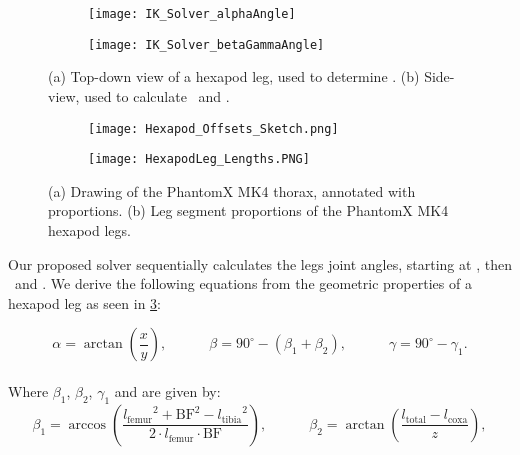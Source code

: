 \begin{figure}[!h]
	\begin{subfigure}{.5\textwidth} %
		\centering
		\texttt{[image: IK\_Solver\_alphaAngle]}  %
		\caption{}
		\label{figure: IK Solver Alpha Angle}
	\end{subfigure}
	\begin{subfigure}{.5\textwidth}
		\centering
		\texttt{[image: IK\_Solver\_betaGammaAngle]}  
		\caption{}
		\label{figure: IK Solver Beta/Gamma Angle}
	\end{subfigure}
	\caption[Angle derivation drawings]{(a) Top-down view of a hexapod leg, used to determine \textalpha. (b) Side-view, used to calculate \textbeta \ and \textgamma.}
	\label{figure: IK angle derivations}
\end{figure}


\begin{figure}[!h]
	\begin{subfigure}{.5\textwidth}
		\centering
		\texttt{[image: Hexapod\_Offsets\_Sketch.png]}  
		\caption{}
		\label{figure: Hexapod thorax sketch}
	\end{subfigure}
	\begin{subfigure}{.5\textwidth} %
		\centering
		\texttt{[image: HexapodLeg\_Lengths.PNG]}  %
		\caption{}
		\label{figure: Hexapod Leg proportions}
	\end{subfigure}
	\caption[Hexapod proportions]{(a) Drawing of the PhantomX MK4 thorax, annotated with proportions. (b)  Leg segment proportions of the PhantomX MK4 hexapod legs.}
	\label{figure: Hexapod proportions}
\end{figure}

Our proposed solver sequentially calculates the legs joint angles, starting at \textalpha, then \textbeta \ and \textgamma.
We derive the following equations from the geometric properties of a hexapod leg as seen in \ref{figure: IK angle derivations}:

\[
	\alpha = \arctan(\frac{x}{y}) ,\quad \quad \quad \beta = 90^{\circ} - (\beta_1 + \beta_2) ,\quad \quad \quad \gamma = 90^{\circ} - \gamma_1.
\]
\\
Where $\beta_1$, $\beta_2$, $\gamma_1$ and  are given by:
\[	
	\beta_1 = \arccos(\frac{{l_\text{femur}}^2 + \text{BF}^2 - {l_\text{tibia}}^2}  {2\cdot l_\text{femur} \cdot \text{BF}}) ,\quad \quad \quad \beta_2 = \arctan(\frac{ l_\text{total} - l_\text{coxa}} {z}),
\]

